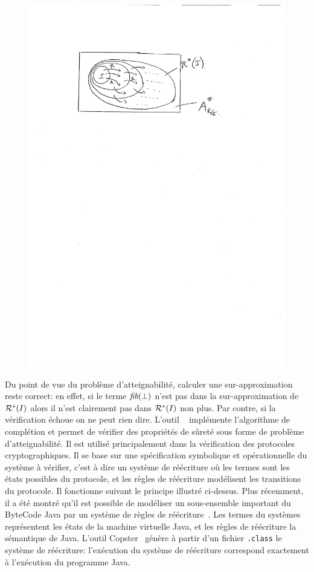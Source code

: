 \begin{figure}[ht!]
  \centering
  \includegraphics[width=12cm]{1_intro/approx}
\end{figure}

Du point de vue du problème d'atteignabilité, calculer une sur-approximation reste correct: en effet, si le terme $\mathit{fib}(\perp)$ 
n'est pas dans la sur-approximation de $\mathcal R^*(I)$ alors il n'est clairement pas dans $\mathcal R^*(I)$
non plus. Par contre, si la vérification échoue on ne peut rien dire.
L'outil \timbuk~\cite{timbuk} implémente l'algorithme de complétion et permet de vérifier des propriétés
de sûreté sous forme de problème d'atteignabilité. Il est utilisé principalement dans la
vérification des protocoles cryptographiques. Il se base sur une spécification symbolique 
et opérationnelle du système à vérifier, c'est à dire un système de réécriture où les termes sont les états possibles
du protocole, et les règles de réécriture modélisent les transitions du protocole.
Il fonctionne suivant le principe illustré ci-dessus.
Plus récemment, il a été montré qu'il est possible de modéliser un sous-ensemble important du ByteCode Java
par un système de règles de réécriture~\cite{BoichutGJL-RTA07}. Les termes du systèmes représentent les états
de la machine virtuelle Java, et les règles de réécriture la sémantique de Java. L'outil Copster~\cite{Copster} 
génère à partir d'un fichier \texttt{.class} le système de réécriture: l'exécution du système de réécriture 
correspond exactement à l'exécution du programme Java. 



